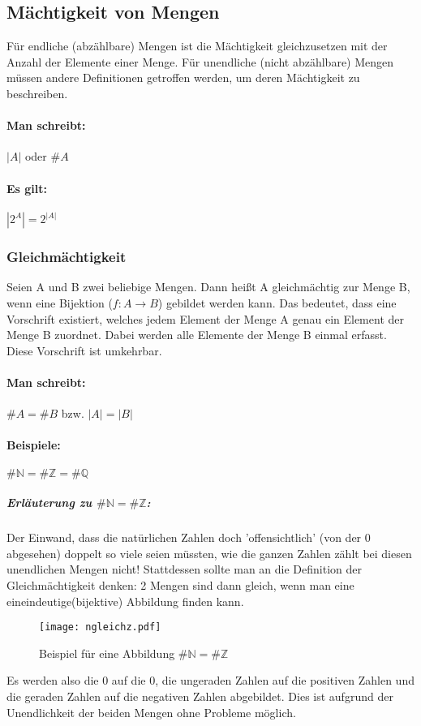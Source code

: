 \subsection{Mächtigkeit von Mengen}
Für endliche (abzählbare) Mengen ist die Mächtigkeit gleichzusetzen mit der Anzahl
der Elemente einer Menge. Für unendliche (nicht abzählbare) Mengen müssen andere
Definitionen getroffen werden, um deren Mächtigkeit zu beschreiben.
\paragraph{Man schreibt:}
\({}|{}A{}|{}\) oder \(\#A\)
\paragraph{Es gilt:}
\begin{math}
{}|{}2^A{}|{} = 2^{{}|{}A{}|{}}
\end{math}
\subsubsection*{Gleichmächtigkeit}
Seien A und B zwei beliebige Mengen.
Dann heißt A gleichmächtig zur Menge B, wenn eine Bijektion (\({f:A}\rightarrow{B}\)) gebildet
werden kann. Das bedeutet, dass eine Vorschrift existiert, welches
jedem Element der Menge A genau ein Element der Menge B zuordnet.
Dabei werden alle Elemente der Menge B einmal erfasst. Diese
Vorschrift ist umkehrbar.
\paragraph{Man schreibt:} \(\#A = \#B\) bzw. \(|A| = |B|\)
\paragraph*{Beispiele:}
\begin{math}
\#{\mathbb N} = \#{\mathbb Z} = \#{\mathbb Q}
\end{math}
\subparagraph{Erläuterung zu \(\#{\mathbb N} = \#{\mathbb Z}\):}
Der Einwand, dass die natürlichen Zahlen doch 'offensichtlich' (von der 0 abgesehen) doppelt so viele seien müssten, wie die ganzen Zahlen zählt bei diesen unendlichen Mengen nicht!
Stattdessen sollte man an die Definition der Gleichmächtigkeit denken: 2 Mengen sind dann gleich, wenn man eine eineindeutige(bijektive) Abbildung finden kann.
\begin{figure}[b]
  \centering
  \caption{Beispiel für eine Abbildung \(\#{\mathbb N} = \#{\mathbb Z}\)}
  \texttt{[image: ngleichz.pdf]}
\end{figure}
Es werden also die 0 auf die 0, die ungeraden Zahlen auf die positiven Zahlen und die geraden Zahlen auf die negativen Zahlen abgebildet. Dies ist aufgrund der Unendlichkeit der beiden Mengen ohne Probleme möglich.

